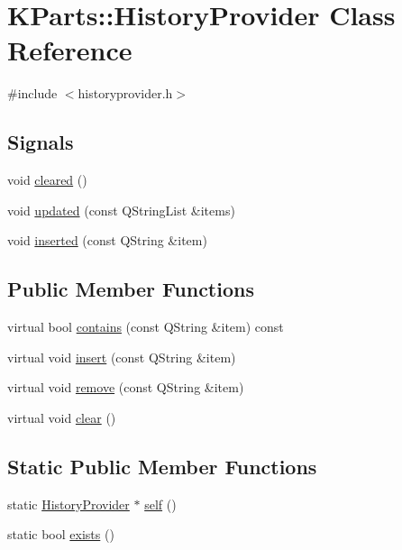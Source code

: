 \hypertarget{classKParts_1_1HistoryProvider}{\section{\-K\-Parts\-:\-:\-History\-Provider \-Class \-Reference}
\label{classKParts_1_1HistoryProvider}
}


{\ttfamily \#include $<$historyprovider.\-h$>$}

\subsection*{\-Signals}
\begin{DoxyCompactItemize}
\item 
void \hyperlink{classKParts_1_1HistoryProvider_ac1328e387f0adb62419ddfdd74b1839e}{cleared} ()
\item 
void \hyperlink{classKParts_1_1HistoryProvider_adf153d0a7a3efcdaba20a86e323e115f}{updated} (const \-Q\-String\-List \&items)
\item 
void \hyperlink{classKParts_1_1HistoryProvider_a24304e5276a1f113314eb7b4e464828f}{inserted} (const \-Q\-String \&item)
\end{DoxyCompactItemize}
\subsection*{\-Public \-Member \-Functions}
\begin{DoxyCompactItemize}
\item 
virtual bool \hyperlink{classKParts_1_1HistoryProvider_a71a0c077cb80205334b56b0fd257a21d}{contains} (const \-Q\-String \&item) const 
\item 
virtual void \hyperlink{classKParts_1_1HistoryProvider_aace7bb17dca383aeecda7a34b9e0f40d}{insert} (const \-Q\-String \&item)
\item 
virtual void \hyperlink{classKParts_1_1HistoryProvider_a5852478b139f20346c53a30543748ed5}{remove} (const \-Q\-String \&item)
\item 
virtual void \hyperlink{classKParts_1_1HistoryProvider_ac377d52046a807032c21e17e8f03dd1e}{clear} ()
\end{DoxyCompactItemize}
\subsection*{\-Static \-Public \-Member \-Functions}
\begin{DoxyCompactItemize}
\item 
static \hyperlink{classKParts_1_1HistoryProvider}{\-History\-Provider} $\ast$ \hyperlink{classKParts_1_1HistoryProvider_a3c2fe96b915ebe5e310bbcbd8499002d}{self} ()
\item 
static bool \hyperlink{classKParts_1_1HistoryProvider_a5d7683f8804027d0a4106ace9a01c926}{exists} ()
\end{DoxyCompactItemize}
